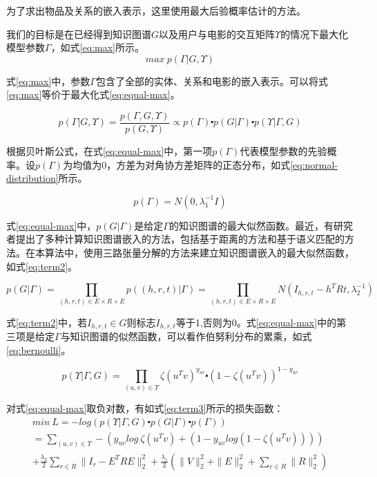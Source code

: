 \documentclass{bjfuthesis}
\begin{document}
为了求出物品及关系的嵌入表示，这里使用最大后验概率估计的方法。

我们的目标是在已经得到知识图谱$G$以及用户与电影的交互矩阵$\Upsilon$的情况下最大化模型参数$\Gamma$，如式\eqref{eq:max}所示。
\begin{equation}
	max\ p(\Gamma |G,\Upsilon)\label{eq:max}
\end{equation}

式\eqref{eq:max}中，参数$\Gamma$包含了全部的实体、关系和电影的嵌入表示。可以将式\eqref{eq:max}等价于最大化式\eqref{eq:equal-max}。

\begin{equation}
	p(\Gamma |G,\Upsilon)=\frac{p(\Gamma,G,\Upsilon)}{p(G,\Upsilon)}\varpropto p(\Gamma)\centerdot p(G|\Gamma)\centerdot p(\Upsilon|\Gamma,G)\label{eq:equal-max}
\end{equation}

根据贝叶斯公式，在式\eqref{eq:equal-max}中，第一项$p(\Gamma)$代表模型参数的先验概率。设$p(\Gamma)$为均值为0，方差为对角协方差矩阵的正态分布，如式\eqref{eq:normal-distribution}所示。

\begin{equation}
	p(\Gamma)=N(0,\lambda_1^{-1}I)\label{eq:normal-distribution}
\end{equation}

式\eqref{eq:equal-max}中，$p(G|\Gamma)$是给定$\Gamma$的知识图谱的最大似然函数。最近，有研究者提出了多种计算知识图谱嵌入的方法，包括基于距离的方法和基于语义匹配的方法。在本算法中，使用三路张量分解的方法来建立知识图谱嵌入的最大似然函数，如式\eqref{eq:term2}。

\begin{equation}
	p(G|\Gamma)=\prod_{(h,r,t)\in E\times R\times E}p((h,r,t)|\Gamma)=\prod_{(h,r,t)\in E\times R\times E}N(I_{h,r,t}-h^TRt,\lambda_2^{-1})\label{eq:term2}
\end{equation}

式\eqref{eq:term2}中，若$I_{h,r,t}\in G$则标志$I_{h,r,t}$等于1,否则为0。式\eqref{eq:equal-max}中的第三项是给定$\Gamma$与知识图谱的似然函数，可以看作伯努利分布的累乘，如式\eqref{eq:bernoulli}。

\begin{equation}
	p(\Upsilon|\Gamma,G)=\prod_{(u,v)\in \Upsilon}\zeta(u^Tv)^{y_{uv}}\centerdot (1-\zeta (u^Tv))^{1-y_{uv}}\label{eq:bernoulli}
\end{equation}

对式\eqref{eq:equal-max}取负对数，有如式\eqref{eq:term3}所示的损失函数：
\begin{multline}
	min\ L=-log(p(\Upsilon|\Gamma,G)\centerdot p(G|\Gamma)\centerdot p(\Gamma))\\
=\sum_{(u,v)\in \Upsilon}-(y_{uv}log\ \zeta(u^Tv)+(1-y_{uv}log(1-\zeta(u^Tv))))\\
+\frac{\lambda_2}{2}\sum_{r\in R}\|I_r-E^TRE\|_2^2+\frac{\lambda_1}{2}(\|V\|^2_2+\|E\|^2_2+\sum_{r\in R}\|R\|^2_2)\label{eq:term3}
\end{multline}
\end{document}
